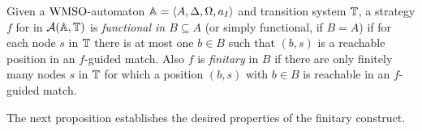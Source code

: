 \begin{definition}\label{def:StratfunctionalFinitary}
Given a $\mathrm{WMSO}$-automaton $\mathbb{A} = \langle{A,\Delta,\Omega,a_I}\rangle$ and transition system $\mathbb{T}$, a strategy $f$ for \eloise in $\mathcal{A}(\mathbb{A},\mathbb{T})$ is \emph{functional in $B \subseteq A$} (or simply functional, if $B=A$) if for each node $s$ in $\mathbb{T}$ there is at most one $b \in B$ such that $(b,s)$ is a reachable position in an $f$-guided match. Also $f$ is \emph{finitary} in $B$ if there are only finitely many nodes $s$ in $\mathbb{T}$ for which a position $(b,s)$ with $b \in B$ is reachable in an $f$-guided match.
\end{definition}



The next proposition establishes the desired properties of the finitary
construct.

